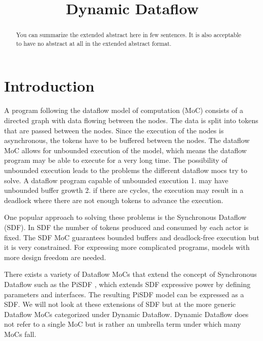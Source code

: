\documentclass[conference,a4paper]{IEEEtran}
\begin{document}
%
\title{Dynamic Dataflow}

\author{
}

\maketitle

\begin{abstract}
You can summarize the extended abstract here in few sentences. It is
also acceptable to have no abstract at all in the extended abstract
format.
\end{abstract}

\section{Introduction}
A program following the dataflow model of computation (MoC) consists of a
directed graph with data flowing between the nodes. The data is split into
tokens that are passed between the nodes. Since the execution of the nodes is
asynchronous, the tokens have to be buffered between the nodes. The dataflow MoC
allows for unbounded execution of the model, which means the dataflow program
may be able to execute for a very long time. The possibility of unbounded
execution leads to the problems the different dataflow mocs try to solve. A
dataflow program capable of unbounded execution 1. may have unbounded buffer
growth 2. if there are cycles, the execution may result in a deadlock where
there are not enough tokens to advance the execution.
\cite{lee2015introduction}

One popular approach to solving these problems is the Synchronous Dataflow
(SDF). In SDF the number of tokens produced and consumed by each actor is fixed.
The SDF MoC guarantees bounded buffers and deadlock-free execution but it is
very constrained. For expressing more complicated programs, models with more
design freedom are needed. \cite{lee2015introduction}

There exists a variety of Dataflow MoCs that extend the concept of Synchronous
Dataflow such as the PiSDF \cite{desnos2013pimm}, which extends SDF expressive
power by defining parameters and interfaces. The resulting PiSDF model can be
expressed as a SDF. We will not look at these extensions of SDF but at the more
generic Dataflow MoCs categorized under Dynamic Dataflow. Dynamic Dataflow does
not refer to a single MoC but is rather an umbrella term under which many MoCs
fall.
\end{document}
